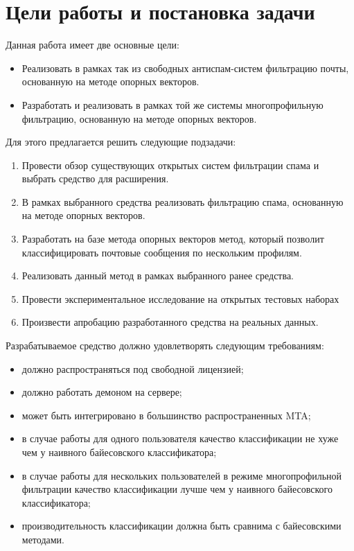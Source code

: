 \newpage
\section{Цели работы и постановка задачи}


Данная работа имеет две основные цели:
\begin{itemize}
\item Реализовать в рамках так из свободных антиспам-систем фильтрацию почты, основанную на методе опорных векторов.
\item Разработать и реализовать в рамках той же системы многопрофильную фильтрацию, основанную на методе опорных векторов.
\end{itemize}

Для этого предлагается решить следующие подзадачи:
\begin{enumerate}
\item  Провести обзор существующих открытых систем фильтрации спама и выбрать средство для расширения. 
\item В рамках выбранного средства реализовать фильтрацию спама, основанную на методе опорных векторов.
\item Разработать на базе метода опорных векторов метод, который позволит классифицировать почтовые сообщения по нескольким профилям.
\item Реализовать данный метод в рамках выбранного ранее средства.
\item Провести экспериментальное исследование на открытых тестовых наборах
\item Произвести апробацию разработанного средства на реальных данных.
\end{enumerate}

Разрабатываемое средство должно удовлетворять следующим требованиям:
\begin{itemize}
\item должно распространяться под свободной лицензией;
\item должно работать демоном на сервере;
\item может быть интегрировано в большинство распространенных MTA;
\item в случае работы для одного пользователя качество классификации не хуже чем у наивного байесовского классификатора;
\item в случае работы для нескольких пользователей в режиме многопрофильной фильтрации качество классификации лучше чем у наивного байесовского классификатора;
\item производительность классификации должна быть сравнима с байесовскими методами.
\end{itemize}
